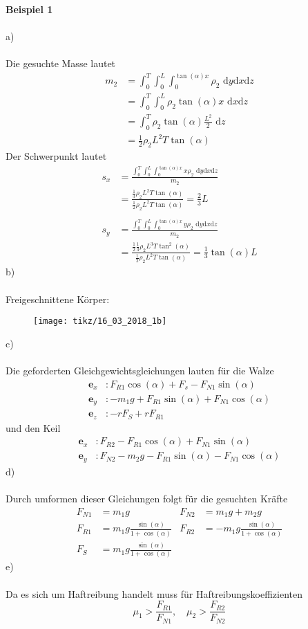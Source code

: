 \textbf{Beispiel 1}\\ \\
a)\\ \\
Die gesuchte Masse lautet
\begin{align*}
	m_2 &= \int_{0}^{T}\int_{0}^{L}\int_{0}^{\tan(\alpha)x}\rho_2 \,\, \text{d}y\text{d}x\text{d}z \\
	&= \int_{0}^{T}\int_{0}^{L}\rho_2\tan(\alpha)x \,\, \text{d}x\text{d}z \\
	&= \int_{0}^{T}\rho_2\tan(\alpha)\frac{L^2}{2} \,\, \text{d}z \\
	&= \frac{1}{2}\rho_2L^2T\tan(\alpha)
\end{align*}
Der Schwerpunkt lautet
\begin{align*}
	s_x &= \frac{\int_{0}^{T}\int_{0}^{L}\int_{0}^{\tan(\alpha)x}x\rho_2 \,\, \text{d}y\text{d}x\text{d}z}{m_2} \\
	    &= \frac{\frac{1}{3}\rho_2L^2T\tan(\alpha)}{\frac{1}{2}\rho_2L^2T\tan(\alpha)} = \frac{2}{3}L \\ \\
	s_y &= \frac{\int_{0}^{T}\int_{0}^{L}\int_{0}^{\tan(\alpha)x}y\rho_2 \,\, \text{d}y\text{d}x\text{d}z}{m_2} \\
	    &= \frac{\frac{1}{2}\frac{1}{3}\rho_2L^3T\tan^2(\alpha)}{\frac{1}{2}\rho_2L^2T\tan(\alpha)} = \frac{1}{3}\tan(\alpha)L
\end{align*}
b)\\ \\
Freigeschnittene Körper:
\begin{figure}[h]
	\centering
	\texttt{[image: tikz/16\_03\_2018\_1b]}
\end{figure}
\newpage
\noindent
c)\\ \\
Die geforderten Gleichgewichtsgleichungen lauten für die Walze
\begin{align*}
	\textbf{e}_x &: F_{R1}\cos(\alpha) + F_s - F_{N1}\sin(\alpha)\\
	\textbf{e}_y &: -m_1g + F_{R1}\sin(\alpha) + F_{N1}\cos(\alpha)\\
	\textbf{e}_z &: -rF_S + rF_{R1}
\end{align*}
und den Keil
\begin{align*}
	\textbf{e}_x &: F_{R2} - F_{R1}\cos(\alpha) + F_{N1}\sin(\alpha)\\
	\textbf{e}_y &: F_{N2} - m_2g - F_{R1}\sin(\alpha) - F_{N1}\cos(\alpha)
\end{align*}
d)\\ \\
Durch umformen dieser Gleichungen folgt für die gesuchten Kräfte
\begin{align*}
	F_{N1} &= m_1g & F_{N2} &= m_1g + m_2g \\
	F_{R1} &= m_1g\frac{\sin(\alpha)}{1+\cos(\alpha)} & F_{R2} &= -m_1g\frac{\sin(\alpha)}{1+\cos(\alpha)} \\
	F_S &= m_1g\frac{\sin(\alpha)}{1+\cos(\alpha)}
\end{align*}
e)\\ \\
Da es sich um Haftreibung handelt muss für Haftreibungskoeffizienten
\[
	\mu_1 > \frac{F_{R1}}{F_{N1}}, \quad \mu_2 > \frac{F_{R2}}{F_{N2}}
\]